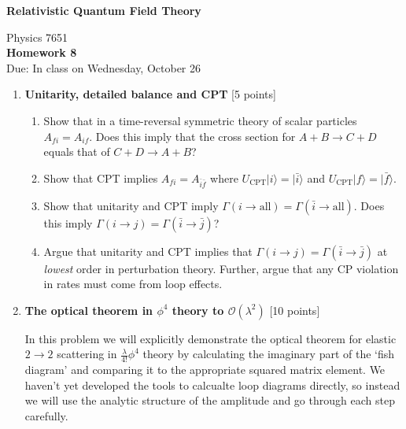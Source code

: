 \documentclass[12pt]{article}
\begin{document}
\vspace*{-1cm}
\begin{center}
{\LARGE \bf Relativistic Quantum Field Theory}

\vspace*{0.5cm}
{\Large Physics 7651} \\
\vspace*{0.5cm}
{\Large {\bf Homework 8}\\
\vspace*{0.5cm}
Due: In class on Wednesday, October 26}
\end{center}
\begin{enumerate}



\item {\bf Unitarity, detailed balance and CPT} [5 points]

\begin{enumerate}
\item  Show that in a time-reversal symmetric theory of scalar particles $A_{fi}=A_{if}$. Does this imply that the cross section for $A+B\to C+D$ equals that of $C+D\to A+B$?
 
 \item Show that CPT implies $A_{fi}=A_{\bar{i}\bar{f}}$ where $U_{\text{CPT}} |i\rangle=|\bar{i}\rangle$ and $U_{\text{CPT}}|f\rangle=|\bar{f}\rangle$.
 
 \item Show that unitarity and CPT imply $\Gamma (i\to \text{all}) = \Gamma (\bar{i}\to \text{all})$. Does this imply $\Gamma (i\to j) = \Gamma (\bar{i}\to \bar{j})$?
 
 \item Argue that unitarity and CPT implies that $\Gamma (i\to j) = \Gamma (\bar{i}\to \bar{j})$ at \textit{lowest} order in perturbation theory. Further, argue that any CP violation in rates must come from loop effects. 
 
 \end{enumerate}
 \vspace{1em}

\item {\bf The optical theorem in $\phi^4$ theory to $\mathcal O(\lambda^2)$} [10 points]

In this problem we will explicitly demonstrate the optical theorem for elastic $2\to 2$ scattering in $\frac{\lambda}{4!}\phi^4$ theory by calculating the imaginary part of the `fish diagram' and comparing it to the appropriate squared matrix element. We haven't yet developed the tools to calcualte loop diagrams directly, so instead we will use the analytic structure of the amplitude and go through each step carefully.


\end{enumerate}
\end{document}
